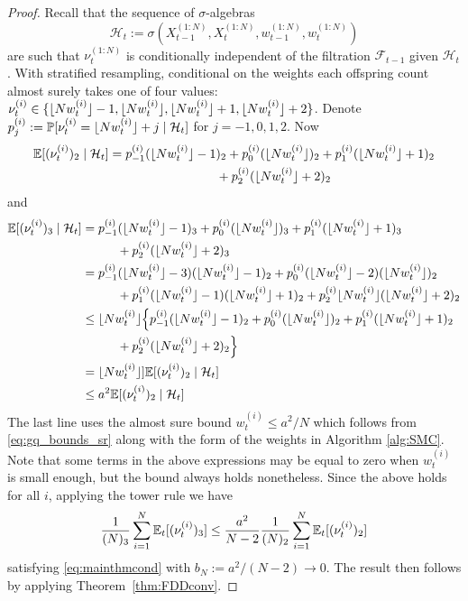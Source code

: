 \begin{proof}
Recall that the sequence of $\sigma$-algebras
\begin{equation}\label{eq:defn_Ht}
\mathcal{H}_t := \sigma(X_{t-1}^{(1:N)}, X_t^{(1:N)}, w_{t-1}^{(1:N)}, w_t^{(1:N)} )
\end{equation}
are such that $\nu_t^{(1:N)}$ is conditionally independent of the filtration $\mathcal{F}_{t-1}$ given $\mathcal{H}_t$.
With stratified resampling, conditional on the weights each offspring count almost surely takes one of four values: $\nu_t^{(i)} \in \{ \lfloor N w_t^{(i)} \rfloor -1, \lfloor N w_t^{(i)} \rfloor, \lfloor N w_t^{(i)} \rfloor +1, \lfloor N w_t^{(i)} \rfloor +2 \}$.  
Denote $p_j^{(i)} := \mathbb{P}[ \nu_t^{(i)} = \lfloor N w_t^{(i)} \rfloor +j \mid \mathcal{H}_t ]$ for $j=-1,0,1,2$.
Now
\begin{align*}
\E [(\nu_t^{(i)})_2 \mid \mathcal{H}_t ]
&= p_{-1}^{(i)} (\flnw -1)_2 + p_0^{(i)} (\flnw)_2 + p_1^{(i)} (\flnw +1)_2 \\
    &\hspace{3cm} + p_2^{(i)} (\flnw +2)_2
\end{align*}
and
\begin{align*}
\mathbb{E} [(\nu_t^{(i)})_3 \mid \mathcal{H}_t ]
&= p_{-1}^{(i)} (\lfloor N w_t^{(i)} \rfloor -1)_3 + p_0^{(i)} (\lfloor N w_t^{(i)} \rfloor)_3 + p_1^{(i)} (\lfloor N w_t^{(i)} \rfloor +1)_3 \\
    &\hspace{1cm} + p_2^{(i)} (\lfloor N w_t^{(i)} \rfloor +2)_3 \\
&= p_{-1}^{(i)} (\lfloor N w_t^{(i)} \rfloor -3)(\lfloor N w_t^{(i)} \rfloor -1)_2 + p_0^{(i)} (\lfloor N w_t^{(i)} \rfloor -2)(\lfloor N w_t^{(i)} \rfloor)_2 \\
     &\hspace{1cm} + p_1^{(i)} (\lfloor N w_t^{(i)} \rfloor -1)(\lfloor N w_t^{(i)} \rfloor +1)_2 
         + p_2^{(i)} \lfloor N w_t^{(i)} \rfloor (\lfloor N w_t^{(i)} \rfloor +2)_2 \\
&\leq \lfloor N w_t^{(i)} \rfloor \Big\{ p_{-1}^{(i)} (\lfloor N w_t^{(i)} \rfloor -1)_2 + p_0^{(i)} (\lfloor N w_t^{(i)} \rfloor)_2 
        + p_1^{(i)} (\lfloor N w_t^{(i)} \rfloor +1)_2 \\
    &\hspace{1cm} + p_2^{(i)} (\lfloor N w_t^{(i)} \rfloor +2)_2 \Big\} \\
&= \lfloor N w_t^{(i)} \rfloor ]\mathbb{E} [(\nu_t^{(i)})_2 \mid \mathcal{H}_t ] \\
&\leq a^2 \mathbb{E} [(\nu_t^{(i)})_2 \mid \mathcal{H}_t ]
\end{align*}
The last line uses the almost sure bound $w_t^{(i)} \leq a^2 /N$ which follows from \eqref{eq:gq_bounds_sr} along with the form of the weights in Algorithm \ref{alg:SMC}.
Note that some terms in the above expressions may be equal to zero when $w_t^{(i)}$ is small enough, but the bound always holds nonetheless.
Since the above holds for all $i$, applying the tower rule we have
\begin{equation*}
\frac{1}{(N)_3} \sum_{i=1}^{N} \mathbb{E}_t [(\nu_t^{(i)})_3 ]
\leq \frac{a^2}{N-2} \frac{1}{(N)_2} \sum_{i=1}^{N} \mathbb{E}_t [(\nu_t^{(i)})_2 ]
\end{equation*}
satisfying \eqref{eq:mainthmcond} with $b_N := a^2/(N-2) \rightarrow 0$.
The result then follows by applying Theorem~\ref{thm:FDDconv}.
\end{proof}



